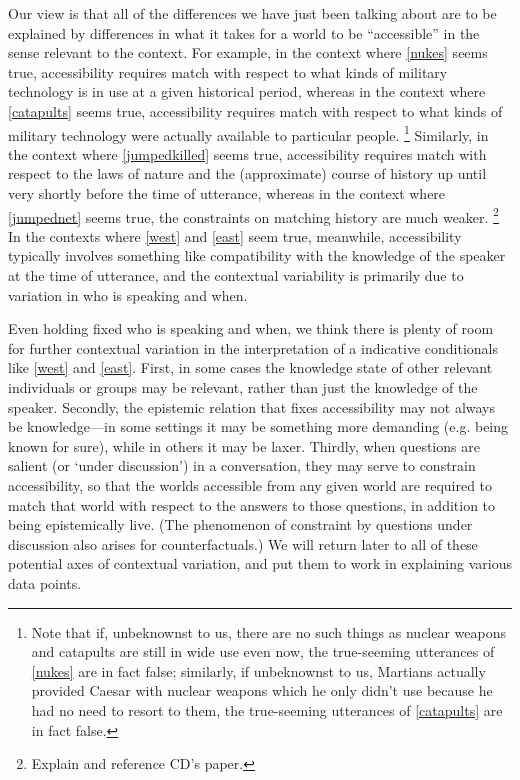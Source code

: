 \documentclass[If.tex]{subfiles}
\begin{document}
Our view is that all of the differences we have just been talking about are to be explained by differences in what it takes for a world to be “accessible” in the sense relevant to the context. For example, in the context where \ref{nukes} seems true, accessibility requires match with respect to what kinds of military technology is in use at a given historical period, whereas in the context where \ref{catapults} seems true, accessibility requires match with respect to what kinds of military technology were actually available to particular people.%
\footnote{Note that if, unbeknownst to us, there are no such things as nuclear weapons and catapults are still in wide use even now, the true-seeming utterances of \ref{nukes} are in fact false; similarly, if unbeknownst to us, Martians actually provided Caesar with nuclear weapons which he only didn't use because he had no need to resort to them, the true-seeming utterances of \ref{catapults} are in fact false.}
 Similarly, in the context where \ref{jumpedkilled} seems true, accessibility requires match with respect to the laws of nature and the (approximate) course of history up until very shortly before the time of utterance, whereas in the context where \ref{jumpednet} seems true, the constraints on matching history are much weaker.%
\footnote{Explain and reference CD's paper.}
 In the contexts where \ref{west} and \ref{east} seem true, meanwhile, accessibility typically involves something like compatibility with the knowledge of the speaker at the time of utterance, and the contextual variability is primarily due to variation in who is speaking and when.

Even holding fixed who is speaking and when, we think there is plenty of room for further contextual variation in the interpretation of a indicative conditionals like \ref{west} and \ref{east}.  First, in some cases the knowledge state of other relevant individuals or groups may be relevant, rather than just the knowledge of the speaker.  Secondly, the epistemic relation that fixes accessibility may not always be knowledge---in some settings it may be something more demanding (e.g. being known for sure), while in others it may be laxer.   Thirdly, when questions are salient (or ‘under discussion’) in a conversation, they may serve to constrain accessibility, so that the worlds accessible from any given world are required to match that world with respect to the answers to those questions, in addition to being epistemically live.  (The phenomenon of constraint by questions under discussion also arises for counterfactuals.)  We will return later to all of these potential axes of contextual variation, and put them to work in explaining various data points.  
\end{document}
